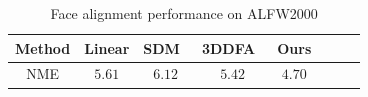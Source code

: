 \begin{table}[t!]
\footnotesize
\caption{\small{Face alignment performance on ALFW2000}} 
\label{tab:2d_face_align}
\vspace{-6mm}
\begin{center}
\begin{tabular}{ cccccccc}
\toprule 
Method & Linear & SDM~\cite{yan2013learn} & 3DDFA~\cite{zhu2016face} & Ours \\ \midrule
NME    & $5.61$ & $6.12$                  & $5.42$                   & $\mathbf{4.70}$ \\ 
\bottomrule
\end{tabular}
\end{center}
\figvspace\vspace{-2mm}
\end{table}



